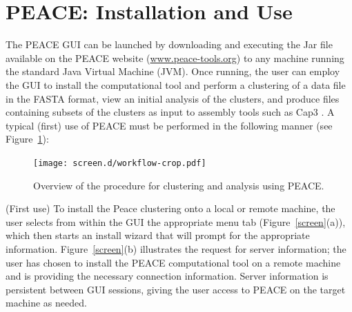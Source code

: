 \documentclass[a4,center,fleqn]{NAR}
\newcommand{\peace} {{\small PEACE}}
\begin{document}
\enlargethispage{-65.1pt}

\section{\peace\/: Installation and Use}

The \peace\/ GUI can be launched by downloading and executing the
Jar file available on the \peace\/ website
(\href{http://www.peace-tools.org}{www.peace-tools.org}) to any
machine running the standard Java Virtual Machine (JVM).  Once
running, the user can employ the GUI to install the computational tool
and perform a clustering of a data file in the FASTA format, view an
initial analysis of the clusters, and produce files containing subsets
of the clusters as input to assembly tools such as {\sc Cap3}
\cite{Huang99}.  A typical (first) use of \peace\/ must be
performed in the following manner (see Figure~\ref{fig:workflow}):

\begin{figure}
  \centerline{\texttt{[image: screen.d/workflow-crop.pdf]}}
  \caption{Overview of the procedure for clustering and analysis using
    PEACE.}\label{fig:workflow}
\end{figure}


 (First use) To install the {\sc
  Peace} clustering onto a local or remote machine, the user selects
from within the GUI the appropriate menu tab (Figure~\ref{screen}(a)),
which then starts an install wizard that will prompt for the
appropriate information.  Figure~\ref{screen}(b) illustrates the
request for server information; the user has chosen to install the
\peace\/ computational tool on a remote machine and is providing
the necessary connection information.  Server information is
persistent between GUI sessions, giving the user access to \peace\/
on the target machine as needed.
\end{document}
